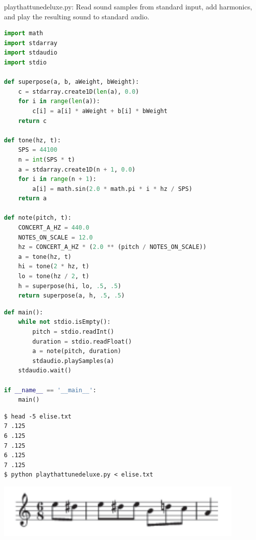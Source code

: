 \documentclass[8pt,a4paper,compress,handout]{beamer}
\begin{document}
\begin{frame}[fragile]
\begin{framed}
\tiny playthattunedeluxe.py: Read sound samples from standard input, add harmonics, and play the resulting sound to standard audio.
\end{framed}

\begin{lstlisting}[language=Python]
import math
import stdarray
import stdaudio
import stdio

def superpose(a, b, aWeight, bWeight):
    c = stdarray.create1D(len(a), 0.0)
    for i in range(len(a)):
        c[i] = a[i] * aWeight + b[i] * bWeight
    return c

def tone(hz, t):
    SPS = 44100
    n = int(SPS * t)
    a = stdarray.create1D(n + 1, 0.0)
    for i in range(n + 1):
        a[i] = math.sin(2.0 * math.pi * i * hz / SPS)
    return a

def note(pitch, t):
    CONCERT_A_HZ = 440.0
    NOTES_ON_SCALE = 12.0
    hz = CONCERT_A_HZ * (2.0 ** (pitch / NOTES_ON_SCALE))
    a = tone(hz, t)
    hi = tone(2 * hz, t)
    lo = tone(hz / 2, t)
    h = superpose(hi, lo, .5, .5)
    return superpose(a, h, .5, .5)
\end{lstlisting}
\end{frame}

\begin{frame}[fragile]
\begin{lstlisting}[language=Python]
def main():
    while not stdio.isEmpty():
        pitch = stdio.readInt()
        duration = stdio.readFloat()
        a = note(pitch, duration)
        stdaudio.playSamples(a)
    stdaudio.wait()

if __name__ == '__main__':
    main()
\end{lstlisting}

\begin{minipage}{170pt}
\begin{lstlisting}[language={}]
$ head -5 elise.txt
7 .125 
6 .125 
7 .125 
6 .125 
7 .125 
$ python playthattunedeluxe.py < elise.txt
\end{lstlisting}
\end{minipage}%
\begin{minipage}{130pt}
\hfill \includegraphics[scale=0.5]{figures/furelise.pdf}
\end{minipage}
\end{frame}
\end{document}
